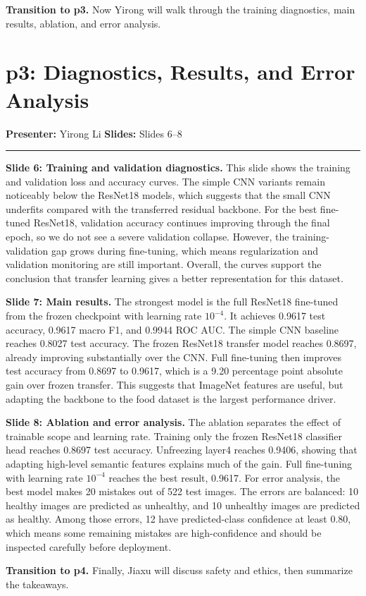\documentclass[11pt]{article}
\newcommand{\parthead}[4]{%
  \section*{\textcolor{BerkeleyBlue}{#1: #2}}%
  \noindent\textbf{Presenter:} #3 \hfill \textbf{Slides:} #4%
  \par\vspace{0.4em}\hrule\vspace{0.8em}
}
\begin{document}
\textbf{Transition to p3.}
Now Yirong will walk through the training diagnostics, main results, ablation, and error analysis.

\parthead{p3}{Diagnostics, Results, and Error Analysis}{Yirong Li}{Slides 6--8}

\textbf{Slide 6: Training and validation diagnostics.}
This slide shows the training and validation loss and accuracy curves. The simple CNN variants remain noticeably below the ResNet18 models, which suggests that the small CNN underfits compared with the transferred residual backbone. For the best fine-tuned ResNet18, validation accuracy continues improving through the final epoch, so we do not see a severe validation collapse. However, the training-validation gap grows during fine-tuning, which means regularization and validation monitoring are still important. Overall, the curves support the conclusion that transfer learning gives a better representation for this dataset.

\textbf{Slide 7: Main results.}
The strongest model is the full ResNet18 fine-tuned from the frozen checkpoint with learning rate \(10^{-4}\). It achieves 0.9617 test accuracy, 0.9617 macro F1, and 0.9944 ROC AUC. The simple CNN baseline reaches 0.8027 test accuracy. The frozen ResNet18 transfer model reaches 0.8697, already improving substantially over the CNN. Full fine-tuning then improves test accuracy from 0.8697 to 0.9617, which is a 9.20 percentage point absolute gain over frozen transfer. This suggests that ImageNet features are useful, but adapting the backbone to the food dataset is the largest performance driver.

\textbf{Slide 8: Ablation and error analysis.}
The ablation separates the effect of trainable scope and learning rate. Training only the frozen ResNet18 classifier head reaches 0.8697 test accuracy. Unfreezing layer4 reaches 0.9406, showing that adapting high-level semantic features explains much of the gain. Full fine-tuning with learning rate \(10^{-4}\) reaches the best result, 0.9617. For error analysis, the best model makes 20 mistakes out of 522 test images. The errors are balanced: 10 healthy images are predicted as unhealthy, and 10 unhealthy images are predicted as healthy. Among those errors, 12 have predicted-class confidence at least 0.80, which means some remaining mistakes are high-confidence and should be inspected carefully before deployment.

\textbf{Transition to p4.}
Finally, Jiaxu will discuss safety and ethics, then summarize the takeaways.
\end{document}
